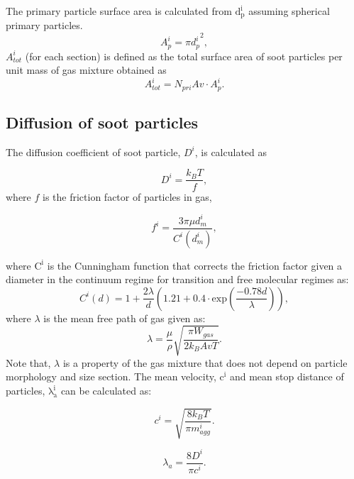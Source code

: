 The primary particle surface area is calculated from $\mathrm{d^i_p}$ assuming spherical primary particles.
\begin{equation}
	A^i_{p} = \pi {d^i_p}^2
	\label{eqn:Ap},
\end{equation}
$A^i_{tot}$ (for each section) is defined as the total surface area of soot particles per unit mass of gas mixture obtained as
\begin{equation}
	A^i_{tot} = N_{pri}Av\cdot A^i_{p}
	\label{eqn:Atot}.
\end{equation}

\subsection{Diffusion of soot particles}

The diffusion coefficient of soot particle, $D^i$, is calculated as

\begin{equation}
	D^i = \frac{k_B T}{f}
	\label{eqn:diff},
\end{equation}
\noindent where $f$ is the friction factor of particles in gas,

\begin{equation}
	f^i = \frac{3\pi\mu d^i_m}{C^i(d^i_m)}
	\label{eqn:fraction},
\end{equation}

\noindent where $\mathrm{C^i}$ is the Cunningham function that corrects the friction factor given a diameter in the continuum regime for transition and free molecular regimes as: 
\begin{equation}
	C^i(d) = 1+\frac{2\lambda}{d}
	\left(
	1.21+0.4\cdot\mathrm{exp}(\frac{-0.78d}{\lambda})
	\right)
	\label{eqn:cun},
\end{equation}
\noindent where $\lambda$ is the mean free path of gas given as:
\begin{equation}
	\lambda = \frac{\mu}{\rho}\sqrt{\frac{\pi W_{gas}}{2k_B Av T}}
	\label{eqn:lambda}.
\end{equation}
Note that, $\lambda$ is a property of the gas mixture that does not depend on particle morphology and size section. The mean velocity, $\mathrm{c^i}$ and mean stop distance of particles, $\mathrm{\lambda^i_a}$ can be calculated as:

\begin{equation}
	c^i = \sqrt{\frac{8k_B T}{\pi m^i_{agg}}}
	\label{eqn:meanvel}.
\end{equation}

\begin{equation}
	\lambda_a = \frac{8D^i}{\pi c^i}
	\label{eqn:stopdist}.
\end{equation}


